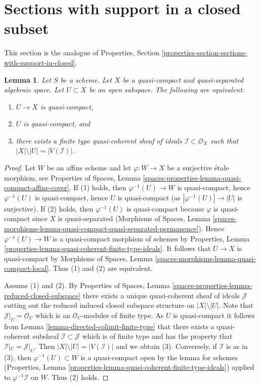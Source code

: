 \documentclass{stacks-project}
\theoremstyle{plain}
\newtheorem{lemma}[subsection]{Lemma}
\theoremstyle{definition}
\theoremstyle{remark}
\numberwithin{equation}{subsection}
\begin{document}
\section{Sections with support in a closed subset}
\label{section-sections-with-support-in-closed}

\noindent
This section is the analogue of
Properties, Section \ref{properties-section-sections-with-support-in-closed}.

\begin{lemma}
\label{lemma-quasi-coherent-finite-type-ideals}
Let $S$ be a scheme.
Let $X$ be a quasi-compact and quasi-separated algebraic space.
Let $U \subset X$ be an open subspace. The following are equivalent:
\begin{enumerate}
\item $U \to X$ is quasi-compact,
\item $U$ is quasi-compact, and
\item there exists a finite type quasi-coherent sheaf of ideals
$\mathcal{I} \subset \mathcal{O}_X$ such that
$|X| \setminus |U| = |V(\mathcal{I})|$.
\end{enumerate}
\end{lemma}

\begin{proof}
Let $W$ be an affine scheme and let $\varphi : W \to X$ be a surjective
\'etale morphism, see Properties of Spaces, Lemma
\ref{spaces-properties-lemma-quasi-compact-affine-cover}.
If (1) holds, then $\varphi^{-1}(U) \to W$ is quasi-compact, hence
$\varphi^{-1}(U)$ is quasi-compact, hence $U$ is quasi-compact
(as $|\varphi^{-1}(U)| \to |U|$ is surjective). If (2) holds, then
$\varphi^{-1}(U)$ is quasi-compact because $\varphi$ is quasi-compact
since $X$ is quasi-separated (Morphisms of Spaces,
Lemma \ref{spaces-morphisms-lemma-quasi-compact-quasi-separated-permanence}).
Hence $\varphi^{-1}(U) \to W$ is a quasi-compact morphism of schemes by
Properties, Lemma \ref{properties-lemma-quasi-coherent-finite-type-ideals}.
It follows that $U \to X$ is quasi-compact by
Morphisms of Spaces, Lemma \ref{spaces-morphisms-lemma-quasi-compact-local}.
Thus (1) and (2) are equivalent.

\medskip\noindent
Assume (1) and (2). By
Properties of Spaces, Lemma
\ref{spaces-properties-lemma-reduced-closed-subspace} there exists
a unique quasi-coherent sheaf of ideals $\mathcal{J}$ cutting
out the reduced induced closed subspace structure on $|X| \setminus |U|$.
Note that $\mathcal{J}|_U = \mathcal{O}_U$ which is an
$\mathcal{O}_U$-modules of finite type.
As $U$ is quasi-compact it follows from
Lemma \ref{lemma-directed-colimit-finite-type}
that there exists a quasi-coherent subsheaf
$\mathcal{I} \subset \mathcal{J}$ which is of finite type
and has the property that $\mathcal{I}|_U = \mathcal{J}|_U$.
Then $|X| \setminus |U| = |V(\mathcal{I})|$ and we obtain (3). Conversely,
if $\mathcal{I}$ is as in (3), then $\varphi^{-1}(U) \subset W$
is a quasi-compact open by the lemma for schemes
(Properties, Lemma \ref{properties-lemma-quasi-coherent-finite-type-ideals})
applied to $\varphi^{-1}\mathcal{I}$ on $W$.
Thus (2) holds.
\end{proof}
\end{document}
